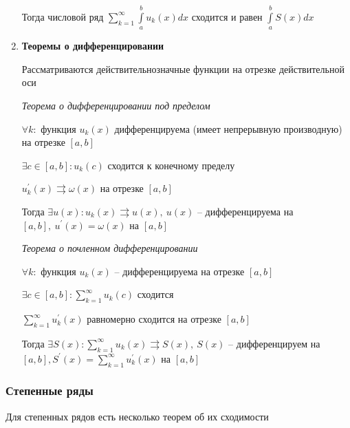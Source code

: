 \documentclass{article}
\begin{document}
\begin{enumerate}
	Тогда числовой ряд $\sum\limits_{k=1}^{\infty}\int\limits_{a}^{b} u_k(x) dx$ сходится и равен $\int\limits_a^b S(x) dx$
	
	\item {\bf Теоремы о дифференцировании}
	
	Рассматриваются действительнозначные функции на отрезке действительной оси
	
	{\it Теорема о дифференцировании под пределом}
	
	$\forall k:$ функция $u_k(x)$ дифференцируема (имеет непрерывную производную) на отрезке $[a, b]$
	
	$\exists c \in [a, b]: u_k(c)$ сходится к конечному пределу
	
	$u_k^{\prime}(x)  \rightrightarrows \omega(x)$ на отрезке $[a, b]$
	
	Тогда $\exists u(x): u_k(x) \rightrightarrows u(x),\ u(x)$ -- дифференцируема на $[a, b],\ u^{\prime}(x) = \omega(x)$ на $[a, b]$
	
	{\it Теорема о почленном дифференцировании}
	
	$\forall k:$ функция $u_k(x)$ -- дифференцируема на отрезке $[a, b]$
	
	$\exists c \in [a, b]: \sum\limits_{k=1}^{\infty} u_k(c)$ сходится
	
	$\sum\limits_{k=1}^{\infty}u_k^{\prime}(x)$ равномерно сходится на отрезке $[a, b]$
	
	Тогда $\exists S(x): \sum\limits_{k=1}^{\infty}u_k(x) \rightrightarrows S(x),\ S(x)$ -- дифференцируем на $[a, b], S^{\prime}(x) = \sum\limits_{k=1}^{\infty}u_k^{\prime}(x)$ на $[a, b]$
	
\end{enumerate}

\subsubsection{Степенные ряды}


Для степенных рядов есть несколько теорем об их сходимости
\end{document}
